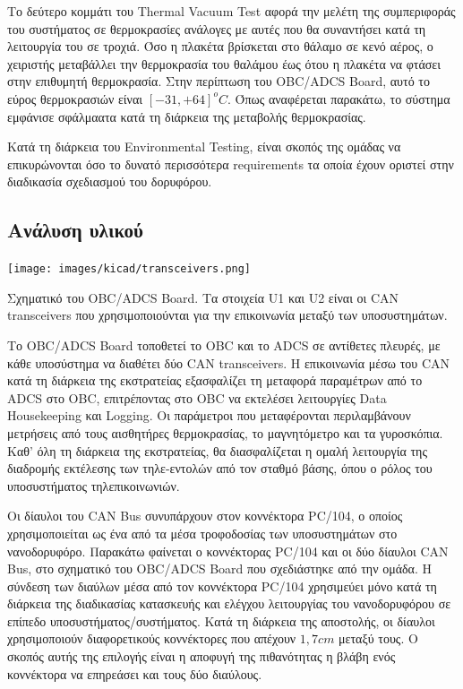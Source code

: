 \documentclass[a4paper,nobib,justified]{tufte-book}
\begin{document}
Το δεύτερο κομμάτι του Thermal Vacuum Test αφορά την μελέτη της συμπεριφοράς του συστήματος σε θερμοκρασίες ανάλογες με αυτές που θα συναντήσει κατά τη λειτουργία του σε τροχιά. Όσο η πλακέτα βρίσκεται στο θάλαμο σε κενό αέρος, ο χειριστής μεταβάλλει την θερμοκρασία του θαλάμου έως ότου η πλακέτα να φτάσει στην επιθυμητή θερμοκρασία. Στην περίπτωση του OBC/ADCS Board, αυτό το εύρος θερμοκρασιών είναι $[-31,+64] ^o C$. Όπως αναφέρεται παρακάτω, το σύστημα εμφάνισε σφάλμαατα κατά τη διάρκεια της μεταβολής θερμοκρασίας.

Κατά τη διάρκεια του Environmental Testing, είναι σκοπός της ομάδας να επικυρώνονται όσο το δυνατό περισσότερα requirements τα οποία έχουν οριστεί στην διαδικασία σχεδιασμού του δορυφόρου.
\subsection{Ανάλυση υλικού}
\begin{marginfigure}
	\texttt{[image: images/kicad/transceivers.png]}
	\caption[Σχηματικό του OBC/ADCS Board]{Σχηματικό του OBC/ADCS Board. Τα στοιχεία U1 και U2 είναι οι CAN transceivers που χρησιμοποιούνται για την επικοινωνία μεταξύ των υποσυστημάτων.}
	\label{fig:schematic-transceivers}
\end{marginfigure}

Το OBC/ADCS Board τοποθετεί το OBC και το ADCS σε αντίθετες πλευρές, με κάθε υποσύστημα να διαθέτει δύο CAN transceivers. Η επικοινωνία μέσω του CAN κατά τη διάρκεια της εκστρατείας εξασφαλίζει τη μεταφορά παραμέτρων από το ADCS στο OBC, επιτρέποντας στο OBC να εκτελέσει λειτουργίες Data Housekeeping και Logging. Οι παράμετροι που μεταφέρονται περιλαμβάνουν μετρήσεις από τους αισθητήρες θερμοκρασίας, το μαγνητόμετρο και τα γυροσκόπια. Καθ' όλη τη διάρκεια της εκστρατείας, θα διασφαλίζεται η ομαλή λειτουργία της διαδρομής εκτέλεσης των τηλε-εντολών από τον σταθμό βάσης, όπου ο ρόλος του υποσυστήματος τηλεπικοινωνιών.

Οι δίαυλοι του CAN Bus συνυπάρχουν στον κοννέκτορα PC/104, ο οποίος χρησιμοποιείται ως ένα από τα μέσα τροφοδοσίας των υποσυστημάτων στο νανοδορυφόρο. Παρακάτω φαίνεται ο κοννέκτορας PC/104 και οι δύο δίαυλοι CAN Bus, στο σχηματικό του OBC/ADCS Board που σχεδιάστηκε από την ομάδα. Η σύνδεση των διαύλων μέσα από τον κοννέκτορα PC/104 χρησιμεύει μόνο κατά τη διάρκεια της διαδικασίας κατασκευής και ελέγχου λειτουργίας του νανοδορυφόρου σε επίπεδο υποσυστήματος/συστήματος. Κατά τη διάρκεια της αποστολής, οι δίαυλοι χρησιμοποιούν διαφορετικούς κοννέκτορες που απέχουν $1,7cm$ μεταξύ τους. Ο σκοπός αυτής της επιλογής είναι η αποφυγή της πιθανότητας η βλάβη ενός κοννέκτορα να επηρεάσει και τους δύο διαύλους. 
\end{document}

